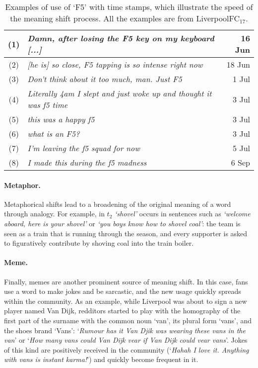 \begin{table}[t]\centering
    \begin{tabular}{@{}cp{5.5cm}r@{}}
        \hline
        (1) & \em Damn, after losing the F5 key on my keyboard [...] & 16 Jun\\\hline
        (2) & \em [he is] so  close, F5 tapping is so intense right now & 18 Jun\\\hline
        (3) & \em Don't think about it too much, man. Just F5 & 1 Jul\\\hline
        (4) & \em Literally 4am I slept and just woke up and thought it was f5 time & 3 Jul\\\hline
        (5) & \em this was a happy f5 & 3 Jul\\\hline
        (6) & \em what is an F5? & 3 Jul \\\hline
        (7) & \em I'm leaving the f5 squad for now & 5 Jul\\\hline
        (8) & \em I made this during the f5 madness & 6 Sep\\\hline      
    \end{tabular}
    \caption{Examples of use of `F5' with time stamps, which illustrate the speed of the meaning shift process. All the examples are from LiverpoolFC$_{17}$.}
     \label{table:f5}
\end{table}

\paragraph{Metaphor.}
Metaphorical shifts lead to a broadening of the original meaning of a
word through analogy.
For example, in $t_2$ {\em `shovel'} occurs in sentences such as \textit{`welcome aboard, here is your shovel'} or 
\textit{`you boys know how to shovel coal'}: the team is seen as a train that is running through the season, and every supporter is asked to figuratively contribute by shoving coal into the train boiler. 

\paragraph{Meme.}
Finally, memes are another prominent source of meaning shift. 
In this case, fans use a word to make jokes and be sarcastic, and the new usage quickly spreads within the community. 
As an example, while Liverpool was about to sign a new player named Van Dijk, redditors started to play with the homography of the first part of the surname with the common noun `van', its plural form `vans', and the shoes brand `Vans': `\textit{Rumour has it Van Djik was wearing these vans in the van}' or `\textit{How many vans could Van Dijk vear if Van Dijk could vear vans}'. 
Jokes of this kind are positively received in the community (`\textit{Hahah I love it. Anything with vans is instant karma!}') and quickly become frequent in it.

